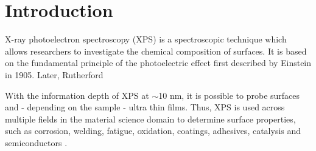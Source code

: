 



\chapter{Introduction} %
\label{Chapter1} %


\newcommand{\keyword}[1]{\textbf{#1}}
\newcommand{\tabhead}[1]{\textbf{#1}}
\newcommand{\code}[1]{\texttt{#1}}
\newcommand{\file}[1]{\texttt{\bfseries#1}}
\newcommand{\option}[1]{\texttt{\itshape#1}}




X-ray photoelectron spectroscopy (XPS) is a spectroscopic technique which allows researchers to investigate the chemical composition of surfaces. It is based on the fundamental principle of the photoelectric effect first described by Einstein \cite{einstein_uber_1905} in 1905. Later, Rutherford 

With the information depth of XPS at $\sim$10 nm, it is possible to probe surfaces and - depending on the sample - ultra thin films.
Thus, XPS is used across multiple fields in the material science domain to determine surface properties, such as corrosion, welding, fatigue, oxidation, coatings, adhesives, catalysis and semiconductors \cite{noauthor_x-ray_nodate}.








